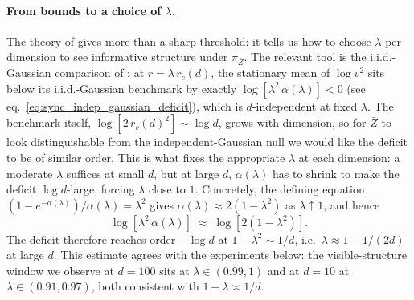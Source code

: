 \documentclass{article}
\newcommand{\bZ}{\bar{Z}}
\begin{document}
\paragraph{From bounds to a choice of $\lambda$.}
The theory of  gives more than a sharp threshold: it tells us how to choose $\lambda$ per dimension to see informative structure under $\pi_{\bZ}$. The relevant tool is the i.i.d.-Gaussian comparison of : at $r = \lambda\, r_c(d)$, the stationary mean of $\log v^2$ sits below its i.i.d.-Gaussian benchmark by exactly $\log[\lambda^2\,\alpha(\lambda)] < 0$ (see eq.~\eqref{eq:sync_indep_gaussian_deficit}), which is $d$-independent at fixed $\lambda$. The benchmark itself, $\log[2\, r_c(d)^2] \sim \log d$, grows with dimension, so for $\bZ$ to look distinguishable from the independent-Gaussian null we would like the deficit to be of similar order. This is what fixes the appropriate $\lambda$ at each dimension: a moderate $\lambda$ suffices at small $d$, but at large $d$, $\alpha(\lambda)$ has to shrink to make the deficit $\log d$-large, forcing $\lambda$ close to $1$. Concretely, the defining equation $(1 - e^{-\alpha(\lambda)})/\alpha(\lambda) = \lambda^2$ gives $\alpha(\lambda) \approx 2(1 - \lambda^2)$ as $\lambda \uparrow 1$, and hence
\begin{equation}
  \label{eq:deficit_asymptotic}
  \log[\lambda^2\,\alpha(\lambda)] \;\approx\; \log[2(1 - \lambda^2)].
\end{equation}
The deficit therefore reaches order $-\log d$ at $1 - \lambda^2 \sim 1/d$, i.e.\ $\lambda \approx 1 - 1/(2d)$ at large $d$. This estimate agrees with the experiments below: the visible-structure window we observe at $d = 100$ sits at $\lambda \in (0.99, 1)$ and at $d = 10$ at $\lambda \in (0.91, 0.97)$, both consistent with $1 - \lambda \asymp 1/d$.
\end{document}

